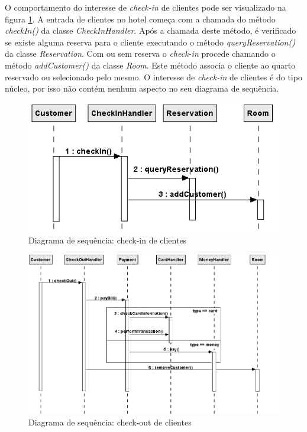 O comportamento do interesse de \textit{check-in} de clientes pode ser visualizado na figura \ref{fig:case_study_behavioral_check_in}. A entrada de
clientes no hotel começa com a chamada do método \textit{checkIn()} da classe \textit{CheckInHandler}. Após a chamada deste método, é verificado se
existe alguma reserva para o cliente executando o método \textit{queryReservation()} da classe \textit{Reservation}. Com ou sem reserva o
\textit{check-in} procede chamando o método \textit{addCustomer()} da classe \textit{Room}. Este método associa o cliente ao quarto reservado ou
selecionado pelo mesmo. O interesse de \textit{check-in} de clientes é do tipo núcleo, por isso não contém nenhum aspecto no seu diagrama de
sequência.

  \begin{figure}[!h]
	\centering
	\includegraphics{img/case_study_behavioral_check_in.png}
	\caption{Diagrama de sequência: check-in de clientes}\label{fig:case_study_behavioral_check_in}
  \end{figure}

\begin{landscape}
  \begin{figure}[!h]
	\centering
	\includegraphics[scale=0.7]{img/case_study_behavioral_check_out.png}
	\caption{Diagrama de sequência: check-out de clientes}\label{fig:case_study_behavioral_check_out}
  \end{figure}
\end{landscape}

